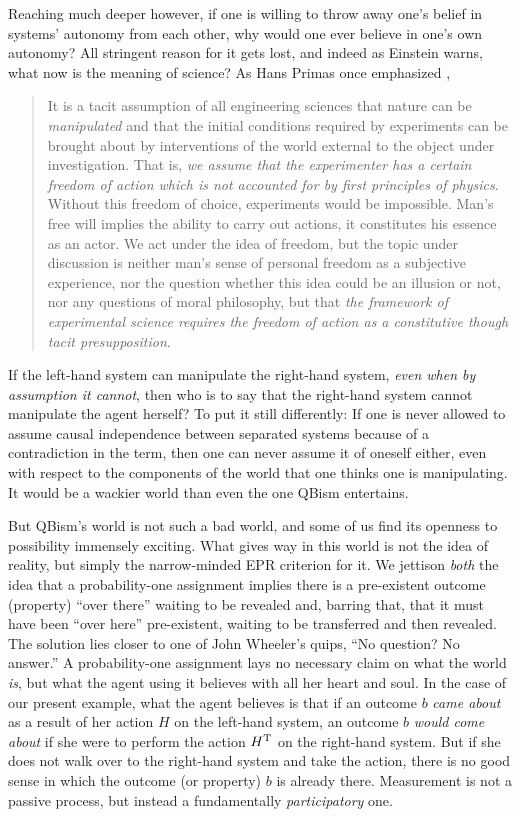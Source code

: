 \documentclass[aps,pra,superscriptaddress,10pt,tightenlines,twocolumn,nofootinbib]{revtex4}
\begin{document}
Reaching much deeper however, if one is willing to throw away one's belief in systems' autonomy from each other, why would one ever believe in one's own autonomy?  All stringent reason for it gets lost, and indeed as Einstein warns, what now is the meaning of science?  As Hans Primas once emphasized \cite{Primas90},
\begin{quote}
\noindent It is a tacit assumption of all engineering sciences that nature can be {\it manipulated\/} and that the initial conditions required by experiments can be brought about by interventions of the world external to the object under investigation.  That is, {\it we assume that the experimenter has a certain freedom of action which is not accounted for by first principles of physics}.  Without this freedom of choice, experiments would be impossible.  Man's free will implies the ability to carry out actions, it constitutes his essence as an actor.  We act under the idea of freedom, but the topic under discussion is neither man's sense of personal freedom as a subjective experience, nor the question whether this idea could be an illusion or not, nor any questions of moral philosophy, but that {\it the framework of experimental science requires the freedom of action as a constitutive though tacit presupposition}.
\end{quote}
If the left-hand system can manipulate the right-hand system, {\it even when by assumption it cannot}, then who is to say that the right-hand system cannot manipulate the agent herself?  To put it still differently:  If one is never allowed to assume causal independence between separated systems because of a contradiction in the term, then one can never assume it of oneself either, even with respect to the components of the world that one thinks one is manipulating.  It would be a wackier world than even the one QBism entertains.

But QBism's world is not such a bad world, and some of us find its
openness to possibility immensely exciting.  What gives way in this
world is not the idea of reality, but simply the narrow-minded EPR
criterion for it.  We jettison  {\it both\/} the idea that a probability-one assignment implies there is a pre-existent outcome (property) ``over there'' waiting to be revealed and, barring that, that it must have been ``over here'' pre-existent, waiting to be transferred and then revealed.  The solution lies closer to one of John Wheeler's quips, ``No question? No answer.''  A probability-one assignment lays no necessary claim on what the world {\it is}, but what the agent using it believes with all her heart and soul.  In the case of our present example, what the agent believes is that if an outcome $b$ {\it came about\/} as a result of her action $H$ on the left-hand system, an outcome $b$ {\it would come about\/} if she were to perform the action $H^{\rm T}$ on the right-hand system.  But if she does not walk over to the right-hand system and take the action, there is no good sense in which the outcome (or property) $b$ is already there.  Measurement is not a passive process, but instead a fundamentally {\it participatory\/} one.
\end{document}
